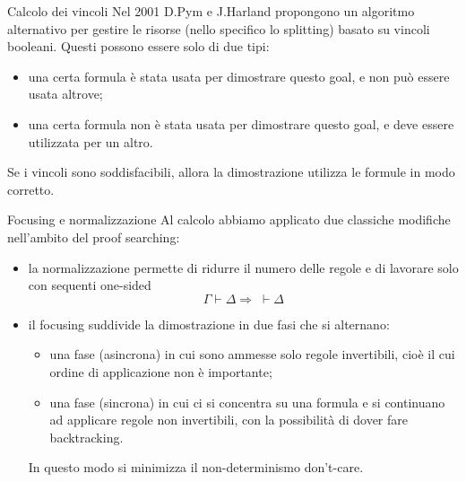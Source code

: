 \documentclass{beamer}
\begin{document}
% 
\begin{frame}{Calcolo dei vincoli}
	Nel 2001 D.Pym e J.Harland propongono un algoritmo alternativo per gestire le risorse (nello specifico lo splitting) basato su vincoli booleani.
	Questi possono essere solo di due tipi:
	\begin{itemize}
		\item una certa formula è stata usata per dimostrare questo goal, e non può essere usata altrove;
		\item una certa formula non è stata usata per dimostrare questo goal, e deve essere utilizzata per un altro.
	\end{itemize}
	Se i vincoli sono soddisfacibili, allora la dimostrazione utilizza le formule in modo corretto.
\end{frame}
\begin{frame}{Focusing e normalizzazione}
	Al calcolo abbiamo applicato due classiche modifiche nell'ambito del proof searching:
	\begin{itemize}
		\item<2-> la normalizzazione permette di ridurre il numero delle regole e di lavorare solo con sequenti one-sided
			$$\Gamma \vdash \Delta \Rightarrow \;\vdash \Delta $$
		\item<3-> il focusing suddivide la dimostrazione in due fasi che si alternano:
			\begin{itemize}
				\item una fase (asincrona) in cui sono ammesse solo regole invertibili, cioè il cui ordine di applicazione non è importante;
				\item una fase (sincrona) in cui ci si concentra su una formula e si continuano ad applicare regole non invertibili, con la possibilità di dover fare backtracking.
			\end{itemize}
			In questo modo si minimizza il non-determinismo don't-care.
	\end{itemize}
\end{frame}
\end{document}
